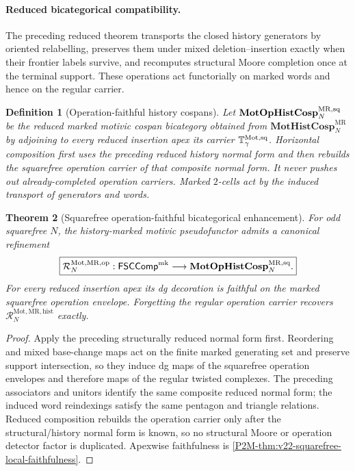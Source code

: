 \documentclass[11pt]{article}
\newtheorem{theorem}{Theorem}[section]
\newtheorem{definition}[theorem]{Definition}
\theoremstyle{remark}
\newcommand{\Mot}{\mathrm{Mot}}
\newcommand{\MR}{\mathrm{MR}}
\providecommand{\FSCComp}{\mathsf{FSCComp}}
\begin{document}
\paragraph{Reduced bicategorical compatibility.}

The preceding reduced theorem transports the closed history generators by oriented relabelling,
preserves them under mixed deletion--insertion exactly when their frontier
labels survive, and recomputes structural Moore completion once at the terminal
support.  These operations act functorially on marked words and hence on the
regular carrier.

\begin{definition}[Operation-faithful history cospans]
\label{P2M-def:v22-operation-history-bicategory}
Let $\mathbf{MotOpHistCosp}_{N}^{\MR,\rm sq}$ be the reduced marked motivic
cospan bicategory obtained from
$\mathbf{MotHistCosp}_{N}^{\MR}$ by adjoining to every reduced insertion apex
its carrier $\mathbb T_{\gamma}^{\Mot,\rm sq}$.  Horizontal composition first
uses the preceding reduced history normal form and then rebuilds the squarefree
operation carrier of that composite normal form.  It never pushes out
already-completed operation carriers.  Marked $2$-cells act by the induced
transport of generators and words.
\end{definition}

\begin{theorem}[Squarefree operation-faithful bicategorical enhancement]
\label{P2M-thm:v22-operation-faithful-bicategorical-enhancement}
For odd squarefree $N$, the history-marked motivic pseudofunctor admits a canonical
refinement
\begin{equation}
 \boxed{
 \mathcal R_N^{\Mot,\MR,\rm op}:
 \FSCComp^{\rm mk}
 \longrightarrow
 \mathbf{MotOpHistCosp}_{N}^{\MR,\rm sq}.}
\end{equation}
For every reduced insertion apex its dg decoration is faithful on the marked
squarefree operation envelope.  Forgetting the regular operation carrier
recovers $\mathcal R_N^{\Mot,\MR,\mathrm{hist}}$ exactly.
\end{theorem}

\begin{proof}
Apply the preceding structurally reduced normal form first.  Reordering and mixed
base-change maps act on the finite marked generating set and preserve support
intersection, so they induce dg maps of the squarefree operation envelopes and
therefore maps of the regular twisted complexes.  The preceding associators and
unitors identify the same composite reduced normal form; the induced word
reindexings satisfy the same pentagon and triangle relations.  Reduced
composition rebuilds the operation carrier only after the structural/history
normal form is known, so no structural Moore or operation detector factor is
duplicated.  Apexwise faithfulness is
\cref{P2M-thm:v22-squarefree-local-faithfulness}.
\end{proof}
\end{document}
